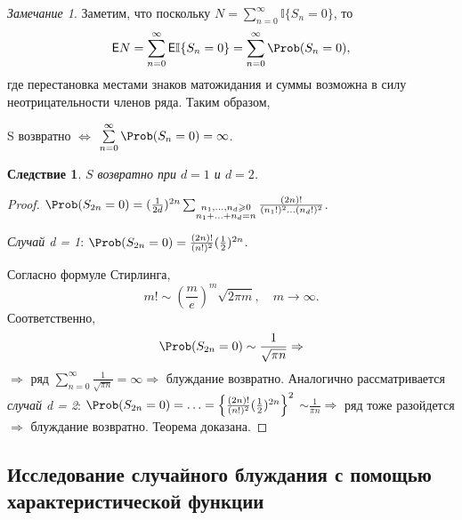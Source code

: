 \documentclass[a4paper]{article}
\newcommand{\Expect}{\mathsf{E}}
\theoremstyle{plain}
\newtheorem*{cor}{Следствие}
\theoremstyle{definition}
\theoremstyle{remark}
\newtheorem*{rem}{Замечание}
\begin{document}
\begin{rem}
  Заметим, что поскольку $N = \sum\limits_{n=0}^{\infty} \mathbb{I} \lbrace S_{n} = 0 \rbrace$, то
  \begin{equation*}
    \Expect N = \sum\limits_{n=0}^{\infty} \Expect \mathbb{I} \lbrace S_{n} = 0 \rbrace = \sum\limits_{n=0}^{\infty} \Prob(S_{n} = 0),
  \end{equation*}
  где перестановка местами знаков матожидания и суммы возможна в силу неотрицательности членов ряда. Таким образом, \begin{center}
    S возвратно $\Leftrightarrow$ $\sum\limits_{n=0}^{\infty} \Prob(S_{n} = 0) = \infty$.
  \end{center}
\end{rem}

\begin{cor}
  $S$ возвратно при $d = 1$ и $d = 2$.
\end{cor}

\begin{proof}
  $\Prob(S_{2n} = 0) = (\frac{1}{2d})^{2n} \sum_{\substack{n_{1}, \ldots, n_{d} \geqslant 0 \\ n_{1} + \ldots + n_{d} = n}} \frac{(2n)!}{(n_{1}!)^{2} \ldots (n_{d}!)^{2}}$.
  \begin{flushleft}
    \emph{Случай d = 1}: $\Prob(S_{2n} = 0) = \frac{(2n)!}{(n!)^{2}}(\frac{1}{2})^{2n}$.
  \end{flushleft}Согласно формуле Стирлинга,
  \begin{equation*}
    m! \sim \left(\frac{m}{e}\right)^{m} \sqrt{2 \pi m}, \quad m \rightarrow \infty.
  \end{equation*}
  Соответственно,
  \begin{equation*}
    \Prob(S_{2n} = 0) \sim \frac{1}{\sqrt{\pi n}} \Rightarrow
  \end{equation*}
  $\Rightarrow$ ряд $\sum\limits_{n=0}^{\infty} \frac{1}{\sqrt{\pi n}} = \infty \Rightarrow$ блуждание возвратно.
  Аналогично рассматривается \emph{случай d = 2}: $\Prob(S_{2n} = 0) = \ldots = \left\lbrace \frac{(2n)!}{(n!)^{2}}(\frac{1}{2})^{2n} \right\rbrace ^{2}$ $\sim \frac{1}{\pi n} \Rightarrow$ ряд тоже разойдется $\Rightarrow$ блуждание возвратно. Теорема доказана.
\end{proof}

\subsection{Исследование случайного блуждания с помощью характеристической функции}
\end{document}
